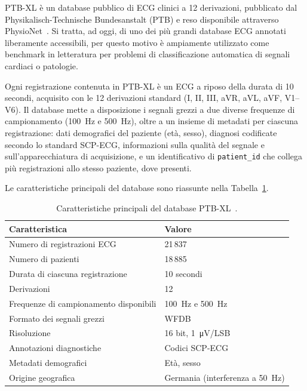 PTB-XL è un database pubblico di ECG clinici a 12 derivazioni, pubblicato dal Physikalisch-Technische Bundesanstalt (PTB) e reso disponibile attraverso PhysioNet~\cite{wagner2020ptbxl}. Si tratta, ad oggi, di uno dei più grandi database ECG annotati liberamente accessibili, per questo motivo è ampiamente utilizzato come benchmark in letteratura per problemi di classificazione automatica di segnali cardiaci o patologie.

Ogni registrazione contenuta in PTB-XL è un ECG a riposo della durata di 10 secondi, acquisito con le 12 derivazioni standard (I, II, III, aVR, aVL, aVF, V1--V6). Il database mette a disposizione i segnali grezzi a due diverse frequenze di campionamento (100~Hz e 500~Hz), oltre a un insieme di metadati per ciascuna registrazione: dati demografici del paziente (età, sesso), diagnosi codificate secondo lo standard SCP-ECG, informazioni sulla qualità del segnale e sull'apparecchiatura di acquisizione, e un identificativo di \texttt{patient\_id} che collega più registrazioni allo stesso paziente, dove presenti.

Le caratteristiche principali del database sono riassunte nella Tabella~\ref{tab:ptbxl_caratteristiche}.

\begin{table}[htbp]
	\centering
	\caption{Caratteristiche principali del database PTB-XL~\cite{wagner2020ptbxl}.}
	\label{tab:ptbxl_caratteristiche}
	\begin{tabular}{@{}ll@{}}
		\toprule
		\textbf{Caratteristica} & \textbf{Valore} \\
		\midrule
		Numero di registrazioni ECG & 21\,837 \\
		Numero di pazienti & 18\,885 \\
		Durata di ciascuna registrazione & 10 secondi \\
		Derivazioni & 12 \\
		Frequenze di campionamento disponibili & 100~Hz e 500~Hz \\
		Formato dei segnali grezzi & WFDB \\
		Risoluzione & 16 bit, \SI{1}{\micro\volt}/LSB \\
		Annotazioni diagnostiche & Codici SCP-ECG \\
		Metadati demografici & Età, sesso \\
		Origine geografica & Germania (interferenza a \SI{50}{Hz}) \\
		\bottomrule
	\end{tabular}
\end{table}


